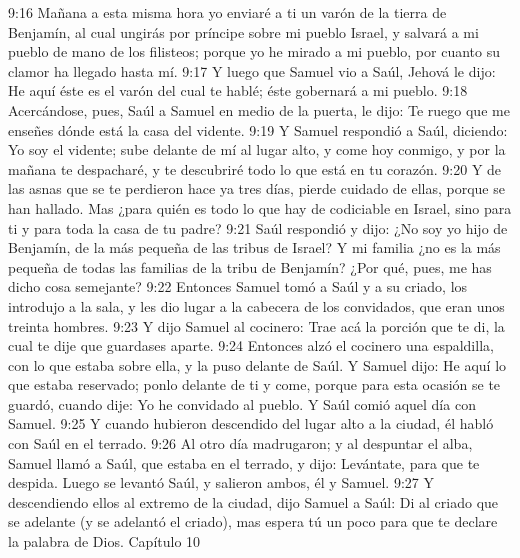 9:16 Mañana a esta misma hora yo enviaré a ti un varón de la tierra de Benjamín, al cual ungirás por príncipe sobre mi pueblo Israel, y salvará a mi pueblo de mano de los filisteos; porque yo he mirado a mi pueblo, por cuanto su clamor ha llegado hasta mí.  
9:17 Y luego que Samuel vio a Saúl, Jehová le dijo: He aquí éste es el varón del cual te hablé; éste gobernará a mi pueblo.  
9:18 Acercándose, pues, Saúl a Samuel en medio de la puerta, le dijo: Te ruego que me enseñes dónde está la casa del vidente.  
9:19 Y Samuel respondió a Saúl, diciendo: Yo soy el vidente; sube delante de mí al lugar alto, y come hoy conmigo, y por la mañana te despacharé, y te descubriré todo lo que está en tu corazón.  
9:20 Y de las asnas que se te perdieron hace ya tres días, pierde cuidado de ellas, porque se han hallado. Mas ¿para quién es todo lo que hay de codiciable en Israel, sino para ti y para toda la casa de tu padre?  
9:21 Saúl respondió y dijo: ¿No soy yo hijo de Benjamín, de la más pequeña de las tribus de Israel? Y mi familia ¿no es la más pequeña de todas las familias de la tribu de Benjamín? ¿Por qué, pues, me has dicho cosa semejante?  
9:22 Entonces Samuel tomó a Saúl y a su criado, los introdujo a la sala, y les dio lugar a la cabecera de los convidados, que eran unos treinta hombres.  
9:23 Y dijo Samuel al cocinero: Trae acá la porción que te di, la cual te dije que guardases aparte.  
9:24 Entonces alzó el cocinero una espaldilla, con lo que estaba sobre ella, y la puso delante de Saúl. Y Samuel dijo: He aquí lo que estaba reservado; ponlo delante de ti y come, porque para esta ocasión se te guardó, cuando dije: Yo he convidado al pueblo. Y Saúl comió aquel día con Samuel.  
9:25 Y cuando hubieron descendido del lugar alto a la ciudad, él habló con Saúl en el terrado.  
9:26 Al otro día madrugaron; y al despuntar el alba, Samuel llamó a Saúl, que estaba en el terrado, y dijo: Levántate, para que te despida. Luego se levantó Saúl, y salieron ambos, él y Samuel.  
9:27 Y descendiendo ellos al extremo de la ciudad, dijo Samuel a Saúl: Di al criado que se adelante (y se adelantó el criado), mas espera tú un poco para que te declare la palabra de Dios.  
Capítulo 10 

